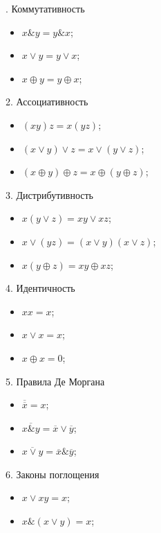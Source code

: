 \begin{multicols}{3}
    . Коммутативность
    \begin{itemize}[nolistsep]
        \item $x\&y = y\&x$;
        \item $x \vee y = y \vee x$;
        \item $x \oplus y = y \oplus x$;
    \end{itemize}
    2. Ассоциативность
    \begin{itemize}[nolistsep]
        \item $(xy)z = x(yz)$;
        \item $(x \vee y) \vee z = x \vee (y \vee z)$;
        \item $(x \oplus y) \oplus z = x \oplus (y \oplus z)$;
    \end{itemize}
    3. Дистрибутивность
    \begin{itemize}[nolistsep]
        \item $x(y \vee z) = xy \vee xz$;
        \item $x \vee (yz) = (x \vee y)(x \vee z)$;
        \item $x(y \oplus z) = xy \oplus xz$;
    \end{itemize}
    4. Идентичность
    \begin{itemize}[nolistsep]
        \item $xx = x$;
        \item $x \vee x = x$;
        \item $x \oplus x = 0$;
    \end{itemize}
    5. Правила Де Моргана
    \begin{itemize}[nolistsep]
        \item $\overline{\overline{x}}=x$;
        \item $\overline{x \& y} = \overline{x}\vee \overline{y}$;
        \item $\overline{x \vee y} = \overline{x} \& \overline{y}$;
    \end{itemize}
    6. Законы поглощения
    \begin{itemize}[nolistsep]
        \item $x\vee xy = x$;
        \item $x \& (x\vee y) = x$;
    \end{itemize}
\end{multicols}